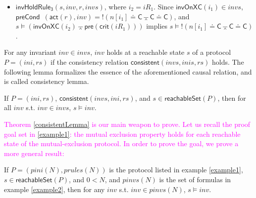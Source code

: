\documentclass[conference]{IEEEtran}
\def \eqc {\doteq }
\def \andc {\barwedge }
\def \negc {!}
\newcommand\lyj[1]{\textcolor{magenta}{ #1}}
\newcommand\cai[1]{\textcolor{blue}{ #1} }
\begin{document}
\begin{example}
\begin{itemize}
\item   $\mathsf{invHoldRule_3 }(s,inv,r,invs)$, where $i_2 = iR_1$.  Since
 $\mathsf{invOnXC}( i_1) \in invs$, $\mathsf{preCond}$\ $(\mathsf{act}(r),inv)=\negc (n[i_1]\eqc\mathsf{C}\andc \mathsf{C}\eqc\mathsf{C})$, and $s \models (\mathsf{invOnXC}( i_2) \andc \mathsf{pre}(\mathsf{crit}(iR_1)))$ implies  $s \models \negc ( n[i_1]\eqc\mathsf{C}\andc \mathsf{C}\eqc\mathsf{C})$. %
 \end{itemize}
\end{example}






For any invariant $inv \in invs$, $inv$ holds at a reachable state $s$  of a protocol $P=(ini,rs)$  if the consistency relation
$\mathsf{consistent}( invs, inis, rs)$ holds. %
The following lemma formalizes the essence of the aforementioned causal relation, and is called consistency lemma.

\begin{theorem}\label{consistentLemma}%
 If $P=(ini,rs)$, $\mathsf{consistent}( invs, ini, rs)$, and $s  \in \mathsf{reachableSet}(P)$, %
 then   for all $inv$ s.t. $inv \in invs$, $s \models inv $.
\end{theorem}


\lyj{
Theorem \ref{consistentLemma} is our main weapon  to prove. Let us recall the proof goal set in \ref{example1}:  the mutual exclusion property holds for each reachable state of the mutual-exclusion protocol. %
In order to prove the goal, we prove a more general result:}
\begin{lemma} \label{caseSimp}
  If $ P=(pini(N),prules(N))$ is the protocol listed in example \ref{example1},  $s \in \mathsf{reachableSet}(P)$, and $0<N$, and $pinvs(N)$ is the set of formulas in example \ref{example2},   then for any $inv$ s.t. $inv \in pinvs(N)$, $s\models inv $.
\end{lemma}
\end{document}
